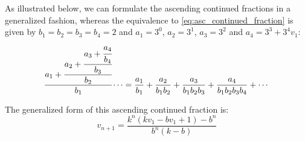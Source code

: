 \par\noindent
As illustrated below, we can formulate the ascending continued fractions in a generalized fashion, whereas the equivalence to \ref{eq:asc_continued_fraction} is given by $b_1=b_2=b_3=b_4=2$ and $a_1=3^0$, $a_2=3^1$, $a_3=3^2$ and $a_4=3^3+3^4v_1$:
\[
\cfrac{a_1+\cfrac{a_2+\cfrac{a_3+\cfrac{a_4}{b_4}}{b_3}}{b_2}}{b_1}\dotsb=\frac{a_1}{b_1}+\frac{a_2}{b_1b_2}+\frac{a_3}{b_1b_2b_3}+\frac{a_4}{b_1b_2b_3b_4}+\cdots
\]

The generalized form of this ascending continued fraction is:
\begin{equation}
\label{eq:generalized_asc_continued_fraction}
v_{n+1}=\frac{k^n(kv_1-bv_1+1)-b^n}{b^n(k-b)}
\end{equation}
